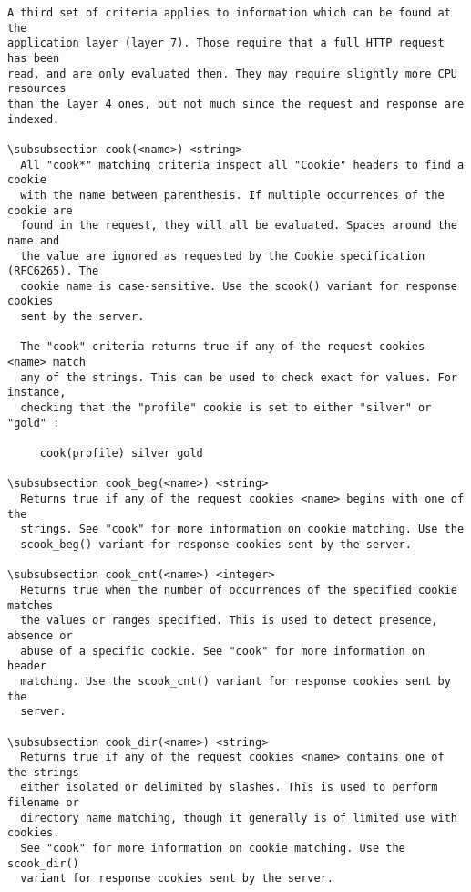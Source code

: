\begin{verbatim}
A third set of criteria applies to information which can be found at the
application layer (layer 7). Those require that a full HTTP request has been
read, and are only evaluated then. They may require slightly more CPU resources
than the layer 4 ones, but not much since the request and response are indexed.

\subsubsection cook(<name>) <string>
  All "cook*" matching criteria inspect all "Cookie" headers to find a cookie
  with the name between parenthesis. If multiple occurrences of the cookie are
  found in the request, they will all be evaluated. Spaces around the name and
  the value are ignored as requested by the Cookie specification (RFC6265). The
  cookie name is case-sensitive. Use the scook() variant for response cookies
  sent by the server.

  The "cook" criteria returns true if any of the request cookies <name> match
  any of the strings. This can be used to check exact for values. For instance,
  checking that the "profile" cookie is set to either "silver" or "gold" :

     cook(profile) silver gold

\subsubsection cook_beg(<name>) <string>
  Returns true if any of the request cookies <name> begins with one of the
  strings. See "cook" for more information on cookie matching. Use the
  scook_beg() variant for response cookies sent by the server.

\subsubsection cook_cnt(<name>) <integer>
  Returns true when the number of occurrences of the specified cookie matches
  the values or ranges specified. This is used to detect presence, absence or
  abuse of a specific cookie. See "cook" for more information on header
  matching. Use the scook_cnt() variant for response cookies sent by the
  server.

\subsubsection cook_dir(<name>) <string>
  Returns true if any of the request cookies <name> contains one of the strings
  either isolated or delimited by slashes. This is used to perform filename or
  directory name matching, though it generally is of limited use with cookies.
  See "cook" for more information on cookie matching. Use the scook_dir()
  variant for response cookies sent by the server.


\end{verbatim}
